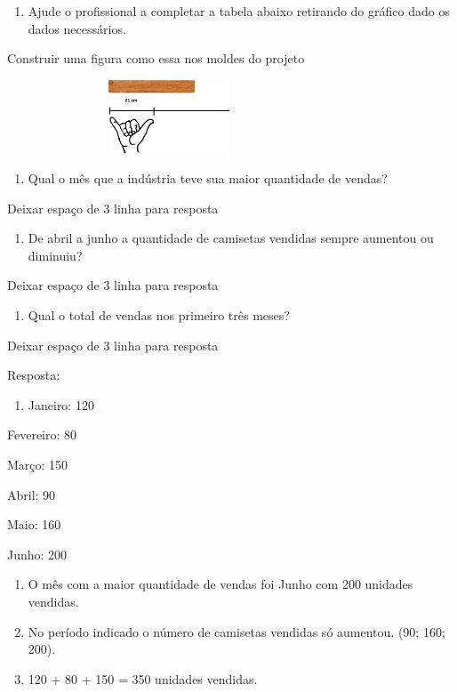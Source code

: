 \begin{enumerate}
\def\labelenumi{\alph{enumi})}
\item
  Ajude o profissional a completar a tabela abaixo retirando do gráfico
  dado os dados necessários.
\end{enumerate}

Construir uma figura como essa nos moldes do projeto

\includegraphics[width=3.78846in,height=0.86073in]{media/image104.png}

\begin{enumerate}
\def\labelenumi{\alph{enumi})}
\item
  Qual o mês que a indústria teve sua maior quantidade de vendas?
\end{enumerate}

Deixar espaço de 3 linha para resposta

\begin{enumerate}
\def\labelenumi{\alph{enumi})}
\item
  De abril a junho a quantidade de camisetas vendidas sempre aumentou ou
  diminuiu?
\end{enumerate}

Deixar espaço de 3 linha para resposta

\begin{enumerate}
\def\labelenumi{\alph{enumi})}
\item
  Qual o total de vendas nos primeiro três meses?
\end{enumerate}

Deixar espaço de 3 linha para resposta

Resposta:

\begin{enumerate}
\def\labelenumi{\alph{enumi})}
\item
  Janeiro: 120
\end{enumerate}

Fevereiro: 80

Março: 150

Abril: 90

Maio: 160

Junho: 200

\begin{enumerate}
\def\labelenumi{\alph{enumi})}
\item
  O mês com a maior quantidade de vendas foi Junho com 200 unidades
  vendidas.
\item
  No período indicado o número de camisetas vendidas só aumentou. (90;
  160; 200).
\item
  120 + 80 + 150 = 350 unidades vendidas.
\end{enumerate}

